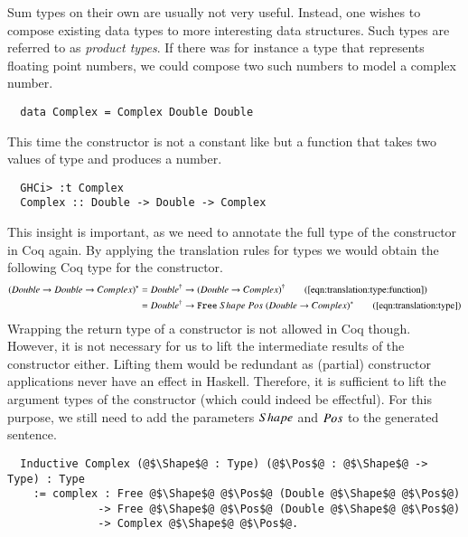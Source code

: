 Sum types on their own are usually not very useful.
Instead, one wishes to compose existing data types to more interesting data structures.
Such types are referred to as \textit{product types}.
If there was for instance a type  that represents floating point numbers, we could compose two such numbers to model a complex number.
\begin{verbatim}
  data Complex = Complex Double Double
\end{verbatim}
This time the constructor  is not a constant like  but a function that takes two values of type  and produces a  number.
\begin{verbatim}
  GHCi> :t Complex
  Complex :: Double -> Double -> Complex
\end{verbatim}
This insight is important, as we need to annotate the full type of the constructor in Coq again.
By applying the translation rules for types we would obtain the following Coq type for the constructor.
\begin{align*}
  \toCoqT{(Double \rightarrow Double \rightarrow Complex)}
    &= \toCoq{Double} \rightarrow \toCoq{(Double \rightarrow Complex)}
    \tag{\autoref{eqn:translation:type:function}}
    \\
    &= \toCoq{Double} \rightarrow \Free{\toCoqT{(Double \rightarrow Complex)}}
    \tag{\autoref{eqn:translation:type}}
\end{align*}
Wrapping the return type of a constructor is not allowed in Coq though.
However, it is not necessary for us to lift the intermediate results of the constructor either.
Lifting them would be redundant as (partial) constructor applications never have an effect in Haskell.
Therefore, it is sufficient to lift the argument types of the constructor (which could indeed be effectful).
For this purpose, we still need to add the parameters $Shape$ and $Pos$ to the generated sentence.
\begin{verbatim}
  Inductive Complex (@$\Shape$@ : Type) (@$\Pos$@ : @$\Shape$@ -> Type) : Type
    := complex : Free @$\Shape$@ @$\Pos$@ (Double @$\Shape$@ @$\Pos$@)
              -> Free @$\Shape$@ @$\Pos$@ (Double @$\Shape$@ @$\Pos$@)
              -> Complex @$\Shape$@ @$\Pos$@.
\end{verbatim}

